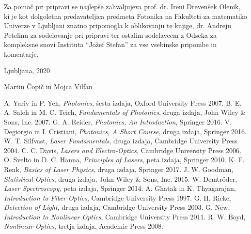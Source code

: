 \documentclass[a4paper,10pt,fleqn]{book}
\begin{document}
Za pomoč pri pripravi se najlepše zahvaljujeva prof. dr. Ireni Drevenšek 
Olenik, ki je kot dolgoletna predavateljica predmeta Fotonika na Fakulteti za 
matematiko Univerze v Ljubljani znatno pripomogla k oblikovanju 
te knjige, dr. Andreju Petelinu za sodelovanje pri pripravi ter 
ostalim sodelavcem z Odseka za kompleksne snovi 
Instituta ``Jožef Stefan'' za vse vsebinske pripombe
in komentarje.

\vspace{1em}

Ljubljana, 2020

\hfill 
Martin Čopič in Mojca Vilfan


\lihastran
\tableofcontents


\lihastran













\lihastran
{}
\renewcommand\bibname{Dodatna literatura}
\begin{thebibliography}{9}
 A. Yariv in P. Yeh, {\it Photonics}, šesta izdaja, Oxford University Press 2007.
  B. E. A. Saleh in M. C. Teich, {\it Fundamentals of Photonics}, druga izdaja, John Wiley \& Sons, Inc. 2007. 
  G. A. Reider, {\it Photonics, An Introduction}, Springer 2016.
  V. Degiorgio in I. Cristiani, {\it Photonics, A Short Course}, druga izdaja, Springer 2016.
  W. T. Silfvast, {\it Laser Fundamentals}, druga izdaja, Cambridge University Press 2004. 
  C. C. Davis, {\it Lasers and Electro-Optics}, Cambridge University Press 2006.
  O. Svelto in D. C. Hanna, {\it Principles of Lasers}, peta izdaja, Springer 2010.
  K. F. Renk, {\it Basics of Laser Physics}, druga izdaja, Springer 2017.
  J. W. Goodman, {\it Statistical Optics}, druga izdaja, John Wiley \& Sons, Inc. 2015.
  W. Demtr\"oder, {\it Laser Spectroscopy}, peta izdaja, Springer 2014.
  A. Ghatak in K. Thyagarajan, {\it Introduction to Fiber Optics}, Cambridge University Press 1997.
  G. H. Rieke, {\it Detection of Light}, druga izdaja, Cambridge University Press 2003.
  G. New, {\it Introduction to Nonlinear Optics}, Cambridge University Press 2011.
  R. W. Boyd, {\it Nonlinear Optics}, tretja izdaja, Academic Press 2008.
\end{thebibliography}
\end{document}
